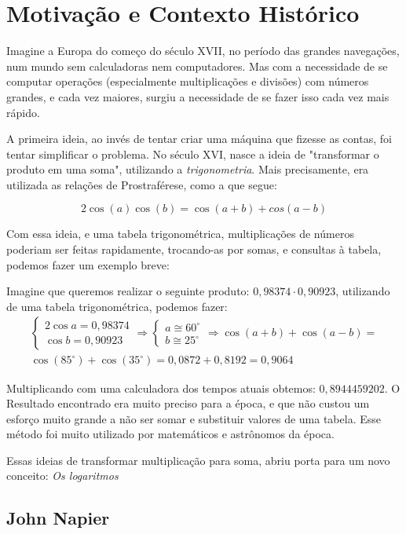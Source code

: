 \section{Motivação e Contexto Histórico}

Imagine a Europa do começo do século XVII, no período das grandes navegações, num mundo sem calculadoras nem computadores. Mas com a necessidade de se computar operações (especialmente multiplicações e divisões) com números grandes, e cada vez maiores, surgiu a necessidade de se fazer isso cada vez mais rápido.

A primeira ideia, ao invés de tentar criar uma máquina que fizesse as contas, foi tentar simplificar o problema. No século XVI, nasce a ideia de "transformar o produto em uma soma", utilizando a \textit{trigonometria}. Mais precisamente, era utilizada as relações de Prostraférese, como a que segue:

\[
    2\cos(a)\cos(b) = \cos(a + b) + cos(a - b)
\]

Com essa ideia, e uma tabela trigonométrica, multiplicações de números poderiam ser feitas rapidamente, trocando-as por somas, e consultas à tabela, podemos fazer um exemplo breve:

Imagine que queremos realizar o seguinte produto: $0,98374 \cdot 0,90923$, utilizando de uma tabela trigonométrica, podemos fazer:
\[
\begin{gathered}
\begin{cases} 2 \cos a = 0,98374 \\ \cos b = 0,90923 \end{cases} \Rightarrow \begin{cases} a \cong 60^\circ \\ b \cong 25^\circ \end{cases} \Rightarrow \cos(a + b) + \cos(a - b) = \\ \cos(85^\circ) + \cos(35^\circ) = 0,0872 + 0,8192 = 0,9064
\end{gathered}
\]

Multiplicando com uma calculadora dos tempos atuais obtemos: $0,8944459202$. O Resultado encontrado era muito preciso para a época, e que não custou um esforço muito grande a não ser somar e substituir valores de uma tabela. Esse método foi muito utilizado por matemáticos e astrônomos da época.

Essas ideias de transformar multiplicação para soma, abriu porta para um novo conceito: \textit{Os logaritmos}

\subsection{John Napier}

